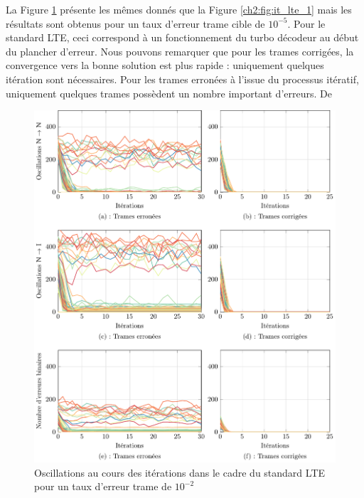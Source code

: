 La Figure \ref{ch2:fig:it_lte_2} présente les mêmes donnés que la Figure \ref{ch2:fig:it_lte_1} mais les résultats sont
obtenus pour un taux d'erreur trame cible de $10^{-5}$. Pour le standard LTE, ceci correspond à un fonctionnement du 
turbo décodeur au début du plancher d'erreur. Nous pouvons remarquer que pour les trames corrigées, la convergence vers 
la bonne solution est plus rapide : uniquement quelques itération sont nécessaires. Pour les trames erronées à l'issue 
du processus itératif, uniquement quelques trames possèdent un nombre important d'erreurs. De

\begin{figure}[!tb]
	\hspace*{-.7cm}
	\includegraphics[]{main/ch2_fig/tikz/it_lte10-5.pdf}
	\caption{Oscillations au cours des itérations dans le cadre du standard LTE pour un taux d'erreur trame de $10^{-2}$ \label{ch2:fig:it_lte_2}}
\end{figure}



